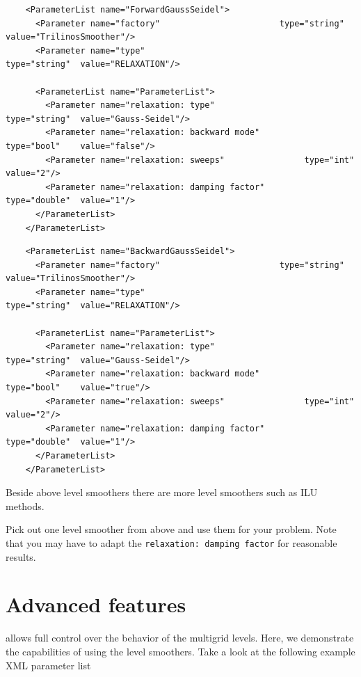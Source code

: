\documentclass[10pt,fleqn]{book}
\begin{document}
\begin{itemize}
\begin{lstlisting}
    <ParameterList name="ForwardGaussSeidel">
      <Parameter name="factory"                        type="string" value="TrilinosSmoother"/>
      <Parameter name="type"                                type="string"  value="RELAXATION"/>

      <ParameterList name="ParameterList">
        <Parameter name="relaxation: type"                  type="string"  value="Gauss-Seidel"/>
        <Parameter name="relaxation: backward mode"         type="bool"    value="false"/>
        <Parameter name="relaxation: sweeps"                type="int"     value="2"/>
        <Parameter name="relaxation: damping factor"        type="double"  value="1"/>
      </ParameterList>
    </ParameterList>
\end{lstlisting}

\begin{lstlisting}
    <ParameterList name="BackwardGaussSeidel">
      <Parameter name="factory"                        type="string" value="TrilinosSmoother"/>
      <Parameter name="type"                                type="string"  value="RELAXATION"/>

      <ParameterList name="ParameterList">
        <Parameter name="relaxation: type"                  type="string"  value="Gauss-Seidel"/>
        <Parameter name="relaxation: backward mode"         type="bool"    value="true"/>
        <Parameter name="relaxation: sweeps"                type="int"     value="2"/>
        <Parameter name="relaxation: damping factor"        type="double"  value="1"/>
      </ParameterList>
    </ParameterList>
\end{lstlisting}
\end{itemize}

Beside above level smoothers there are more level smoothers such as ILU methods.\\

\begin{exercise}
Pick out one level smoother from above and use them for your problem. Note that you may have to adapt the \texttt{relaxation: damping factor} for reasonable results.
\end{exercise}

\section{Advanced features}
\muelu allows full control over the behavior of the multigrid levels. Here, we demonstrate the capabilities of \muelu using the level smoothers.
Take a look at the following example XML parameter list

\end{document}
